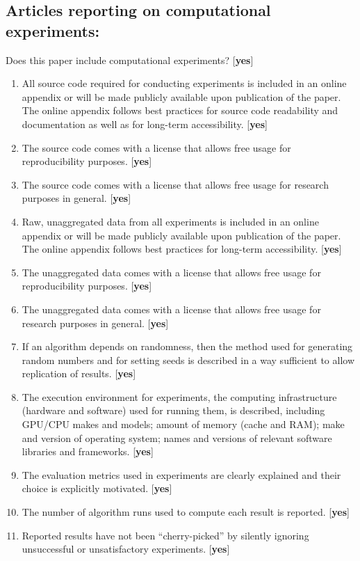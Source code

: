 \subsection*{Articles reporting on computational experiments:}
Does this paper include computational experiments? [\textbf{yes}]

\begin{enumerate}
  \item All source code required for conducting experiments is included in an online appendix or will be made publicly available upon publication of the paper. The online appendix follows best practices for source code readability and documentation as well as for long-term accessibility. [\textbf{yes}]
  \item The source code comes with a license that allows free usage for reproducibility purposes. [\textbf{yes}]
  \item The source code comes with a license that allows free usage for research purposes in general. [\textbf{yes}]
  \item Raw, unaggregated data from all experiments is included in an online appendix or will be made publicly available upon publication of the paper. The online appendix follows best practices for long-term accessibility. [\textbf{yes}]
  \item The unaggregated data comes with a license that allows free usage for reproducibility purposes. [\textbf{yes}]
  \item The unaggregated data comes with a license that allows free usage for research purposes in general. [\textbf{yes}]
  \item If an algorithm depends on randomness, then the method used for generating random numbers and for setting seeds is described in a way sufficient to allow replication of results. [\textbf{yes}]
  \item The execution environment for experiments, the computing infrastructure (hardware and software) used for running them, is described, including GPU/CPU makes and models; amount of memory (cache and RAM); make and version of operating system; names and versions of relevant software libraries and frameworks. [\textbf{yes}]
  \item The evaluation metrics used in experiments are clearly explained and their choice is explicitly motivated. [\textbf{yes}]
  \item The number of algorithm runs used to compute each result is reported. [\textbf{yes}]
  \item Reported results have not been ``cherry-picked'' by silently ignoring unsuccessful or unsatisfactory experiments. [\textbf{yes}]

\end{enumerate}
